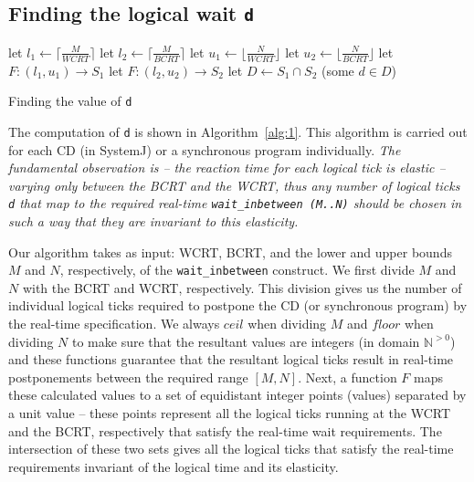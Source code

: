\subsection{Finding the logical wait \texttt{d}}
\label{sec:find-logic-delay}

\begin{algorithm}[t!]
  \begin{minipage}{1.0\linewidth}
    \SetAlgoLined
    let $l_1 \leftarrow \lceil \frac{M}{WCRT} \rceil$\;
    let $l_2 \leftarrow \lceil \frac{M}{BCRT} \rceil$\;
    let $u_1 \leftarrow \lfloor \frac{N}{WCRT} \rfloor$\;
    let $u_2 \leftarrow \lfloor \frac{N}{BCRT} \rfloor$\;
    let $F:(l_1,u_1) \rightarrow S_1$\;
    let $F:(l_2,u_2) \rightarrow S_2$\;
    let $D \leftarrow S_1 \cap S_2$\;
    \Return (some $d \in D$)\;
    \caption{Finding the value of \texttt{d}}
    \label{alg:1}
  \end{minipage}
\end{algorithm}

The computation of \texttt{d} is shown in Algorithm~\ref{alg:1}. This
algorithm is carried out for each CD (in SystemJ) or a synchronous
program individually. \textit{The fundamental observation is -- the
  reaction time for each logical tick is elastic -- varying only between
  the BCRT and the WCRT, thus any number of logical ticks \texttt{d}
  that map to the required real-time \mbox{\texttt{wait\_inbetween
      (M..N)}} should be chosen in such a way that they are invariant to
  this elasticity.}

Our algorithm takes as input: WCRT, BCRT, and the lower and upper bounds
$M$ and $N$, respectively, of the \texttt{wait\_inbetween} construct. We
first divide $M$ and $N$ with the BCRT and WCRT, respectively. This
division gives us the number of individual logical ticks required to
postpone the CD (or synchronous program) by the real-time
specification. We always $ceil$ when dividing $M$ and $floor$ when
dividing $N$ to make sure that the resultant values are integers (in
domain $\mathbb{N}^{>0}$) and these functions guarantee that the
resultant logical ticks result in real-time postponements between the
required range $[M,N]$. Next, a function $F$ maps these calculated
values to a set of equidistant integer points (values) separated by a
unit value -- these points represent all the logical ticks running at
the WCRT and the BCRT, respectively that satisfy the real-time wait
requirements. The intersection of these two sets gives all the logical
ticks that satisfy the real-time requirements invariant of the logical
time and its elasticity.

